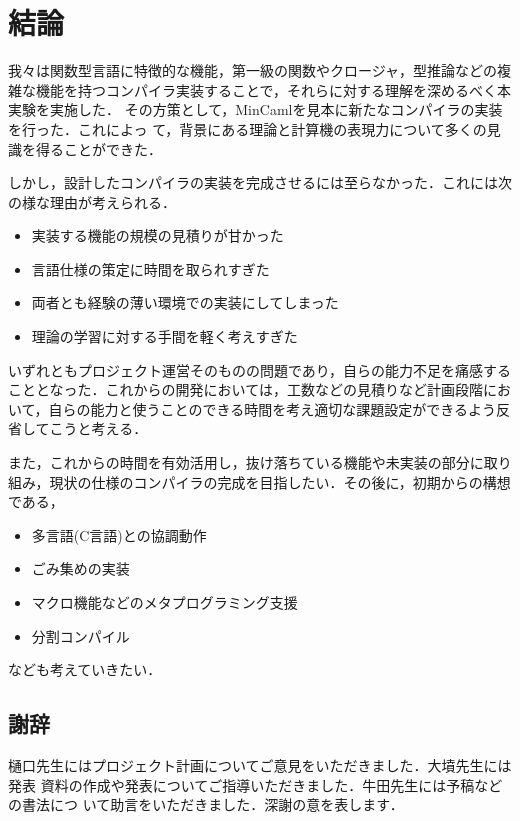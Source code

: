 \documentclass[a4paper,titlepage,report,disablejfam]{jsbook}
\begin{document}
\chapter{結論}\label{ch:conclude}
我々は関数型言語に特徴的な機能，第一級の関数やクロージャ，型推論などの複
雑な機能を持つコンパイラ実装することで，それらに対する理解を深めるべく本
実験を実施した．
その方策として，MinCamlを見本に新たなコンパイラの実装を行った．これによっ
て，背景にある理論と計算機の表現力について多くの見識を得ることができた．

しかし，設計したコンパイラの実装を完成させるには至らなかった．これには次
の様な理由が考えられる．
\begin{itemize}
 \item 実装する機能の規模の見積りが甘かった
 \item 言語仕様の策定に時間を取られすぎた
 \item 両者とも経験の薄い環境での実装にしてしまった
 \item 理論の学習に対する手間を軽く考えすぎた
\end{itemize}

いずれともプロジェクト運営そのものの問題であり，自らの能力不足を痛感する
こととなった．これからの開発においては，工数などの見積りなど計画段階にお
いて，自らの能力と使うことのできる時間を考え適切な課題設定ができるよう反
省してこうと考える．

また，これからの時間を有効活用し，抜け落ちている機能や未実装の部分に取り
組み，現状の仕様のコンパイラの完成を目指したい．その後に，初期からの構想
である，
\begin{itemize}
 \item 多言語(C言語)との協調動作
 \item ごみ集めの実装
 \item マクロ機能などのメタプログラミング支援
 \item 分割コンパイル
\end{itemize}
なども考えていきたい．
\begin{flushright}[文責: 小堀 育男]\end{flushright}

\section*{謝辞}
樋口先生にはプロジェクト計画についてご意見をいただきました．大墳先生には発表
資料の作成や発表についてご指導いただきました．牛田先生には予稿などの書法につ
いて助言をいただきました．深謝の意を表します．




\backmatter
\appendix
\end{document}

